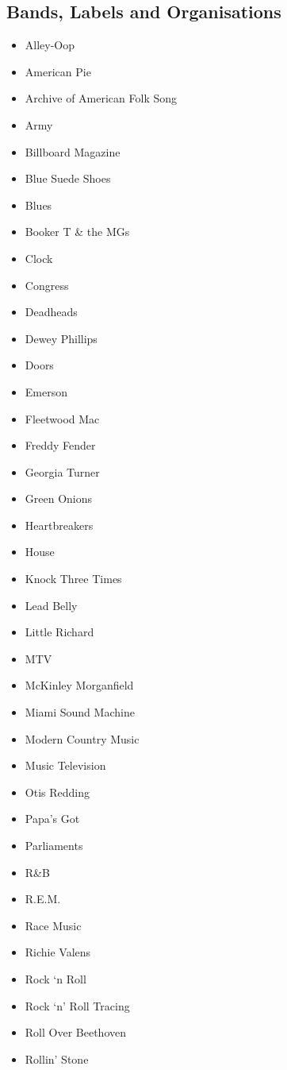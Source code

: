 \documentclass[12pt,a4paper]{article}
\begin{document}
\subsection{Bands, Labels and Organisations}
\begin{itemize}
  \item Alley-Oop
  \item American Pie
  \item Archive of American Folk Song
  \item Army
  \item Billboard Magazine
  \item Blue Suede Shoes
  \item Blues
  \item Booker T \& the MGs
  \item Clock
  \item Congress
  \item Deadheads
  \item Dewey Phillips
  \item Doors
  \item Emerson
  \item Fleetwood Mac
  \item Freddy Fender
  \item Georgia Turner
  \item Green Onions
  \item Heartbreakers
  \item House
  \item Knock Three Times
  \item Lead Belly
  \item Little Richard
  \item MTV
  \item McKinley Morganfield
  \item Miami Sound Machine
  \item Modern Country Music
  \item Music Television
  \item Otis Redding
  \item Papa's Got
  \item Parliaments
  \item R\&B
  \item R.E.M.
  \item Race Music
  \item Richie Valens
  \item Rock `n Roll
  \item Rock `n' Roll Tracing
  \item Roll Over Beethoven
  \item Rollin' Stone

\end{itemize}
\end{document}
